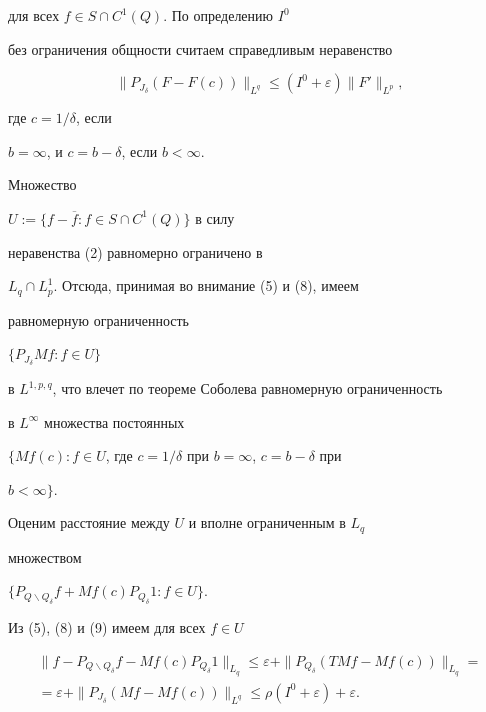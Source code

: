 для всех $f\in S\cap C^1(Q)$. По определению $I^0$


без ограничения общности считаем справедливым неравенство


\begin{equation}


\|P_{J_{\delta}}(F-F(c))\|_{L^q}\le (I^0+\varepsilon)\|F'\|_{L^p},


\end{equation}


где $c=1/\delta$, если


$b=\infty$, и $c=b-\delta$, если $b<\infty$.





Множество


$U:=\{f-\overline f: f\in S\cap C^1(Q)\}$ в силу


неравенства (2) равномерно ограничено в


$L_q\cap L^1_p$. Отсюда, принимая во внимание (5) и (8), имеем


равномерную ограниченность


$\{P_{J_{\delta}}Mf:f\in U\}$


в $L^{1,p,q}$, что влечет по теореме Соболева равномерную ограниченность


в $L^{\infty}$ множества постоянных


$\{Mf(c):f\in U$, где $c=1/\delta$ при $b=\infty$, $c=b-\delta$ при


$b<\infty\}$.





Оценим расстояние между $U$ и вполне ограниченным в $L_q$


множеством


$\{P_{Q\backslash Q_{\delta}}f + Mf(c)P_{Q_{\delta}}1:f\in U\}$.


Из (5), (8) и (9) имеем для всех $f\in U$


\begin{multline*}


\|f-P_{Q\backslash Q_{\delta}}f-Mf(c)P_{Q_{\delta}}1\|_{L_q}\le


\varepsilon + \|P_{Q_{\delta}}(TMf-Mf(c))\|_{L_q}= \\


=\varepsilon+\|P_{J_{\delta}}


(Mf-Mf(c))\|_{L^q}\le \rho (I^0+\varepsilon)+\varepsilon.


\end{multline*}


